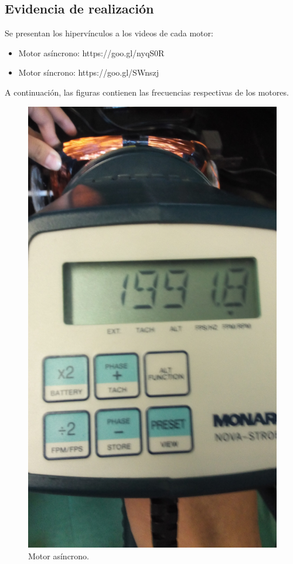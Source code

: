 
\subsection{Evidencia de realizaci\'on}
Se presentan los hiperv\'inculos a los videos de cada motor:
\begin{itemize}
 \item Motor as\'incrono: https://goo.gl/nyqS0R
 \item Motor s\'incrono: https://goo.gl/SWnszj
\end{itemize}

A continuaci\'on, las figuras contienen las frecuencias respectivas de los motores.

\begin{figure}[!htbp]
\caption{Motor as\'incrono.}
\centering
\includegraphics [scale=0.05, angle=-90]
{./img/20160308_130906.jpg}
\end{figure}

